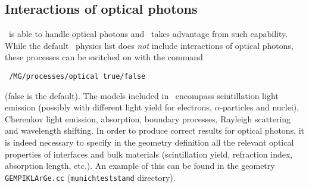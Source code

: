 \subsection{Interactions of optical photons}
\geant\ is able to handle optical photons and \mage\ takes advantage from such capability. While 
the default \mage\ physics list does \emph{not} include interactions of optical photons, these 
processes can be switched on with the command
\begin{lstlisting}
 /MG/processes/optical true/false
\end{lstlisting}
(false is the default). The models included in \mage\ encompass scintillation light 
emission (possibly with different light yield for electrons, $\alpha$-particles and nuclei), 
Cherenkov light emission, absorption, boundary processes, Rayleigh scattering and wavelength shifting. 
In order to produce correct results for optical photons, it is indeed necessary to specify in the 
geometry definition all the relevant optical properties of interfaces and bulk materials 
(scintillation yield, refraction index, absorption length, etc.). An example of this can be 
found in the geometry \texttt{GEMPIKLArGe.cc} (\texttt{munichteststand} directory). 
%
